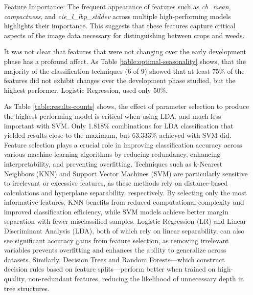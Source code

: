 \documentclass[letterpaper]{report}
\begin{document}
Feature Importance:
The frequent appearance of features such as \textit{cb\_mean}, \textit{compactness}, and \textit{cie\_l\_lbp\_stddev} across multiple high-performing models highlights their importance. This suggests that these features capture critical aspects of the image data necessary for distinguishing between crops and weeds.

It was not clear that features that were not changing over the early development phase has a profound affect. As Table \ref{table:optimal-seasonality} shows, that the majority of the classification techniques (6 of 9) showed that at least 75\% of the features did not exhibit changes over the development phase studied, but the highest performer, Logistic Regression, used only 50\%.

As Table \ref{table:results-counts} shows, the effect of parameter selection to produce the highest performing model is critical when using LDA, and much less important with SVM. 
Only 1.818\% combinations for LDA classification that yielded results close to the maximum, but 63.333\% achieved with SVM did. 
Feature selection plays a crucial role in improving classification accuracy across various machine learning algorithms by reducing redundancy, enhancing interpretability, and preventing overfitting. Techniques such as k-Nearest Neighbors (KNN) and Support Vector Machines (SVM) are particularly sensitive to irrelevant or excessive features, as these methods rely on distance-based calculations and hyperplane separability, respectively. By selecting only the most informative features, KNN benefits from reduced computational complexity and improved classification efficiency, while SVM models achieve better margin separation with fewer misclassified samples. Logistic Regression (LR) and Linear Discriminant Analysis (LDA), both of which rely on linear separability, can also see significant accuracy gains from feature selection, as removing irrelevant variables prevents overfitting and enhances the ability to generalize across datasets. Similarly, Decision Trees and Random Forests—which construct decision rules based on feature splits—perform better when trained on high-quality, non-redundant features, reducing the likelihood of unnecessary depth in tree structures.
\end{document}
